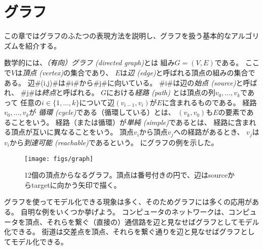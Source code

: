 \chapter{グラフ}


この章ではグラフのふたつの表現方法を説明し、グラフを扱う基本的なアルゴリズムを紹介する。

数学的には、\emph{（有向）グラフ (directed graph)}とは
%
%
組み$G=(V,E)$である。
ここで$V$は\emph{頂点 (vertex)}の集合であり、
%
$E$は\emph{辺 (edge)}と呼ばれる頂点の組みの集合である。
%
辺#(i,j)#は#i#から#j#に向いている。
%
#i#は辺の\emph{始点 (source)}と呼ばれ、
#j#は\emph{終点}と呼ばれる。
$G$における\emph{経路 (path)}%
とは頂点の列$v_0,\ldots,v_k$であって 任意の$i\in\{1,\ldots,k\}$について辺$(v_{i-1},v_{i})$が$E$に含まれるものである。
経路$v_0,\ldots,v_k$が
\emph{循環 (cycle)}である（循環している）とは、
%
$(v_k,v_0)$も$E$の要素であることをいう。
経路（または循環）が\emph{単純 (simple)}であるとは、
%
経路に含まれる頂点が互いに異なることをいう。
頂点$v_i$から頂点$v_j$への経路があるとき、
$v_j$は$v_i$から\emph{到達可能 (reachable)}であるという。
にグラフの例を示した。

\begin{figure}
  \begin{center}
    \texttt{[image: figs/graph]}
  \end{center}
  \caption{12個の頂点からなるグラフ。頂点は番号付きの円で、辺はsourceからtargetに向かう矢印で描く。}
\end{figure}

グラフを使ってモデル化できる現象は多く、そのためグラフには多くの応用がある。
自明な例をいくつか挙げよう。
コンピュータのネットワークは、コンピュータを頂点、それらを繋ぐ（直接の）通信路を辺と見なせばグラフとしてモデル化できる。
街道は交差点を頂点、それらを繋ぐ通りを辺と見なせばグラフとしてモデル化できる。

